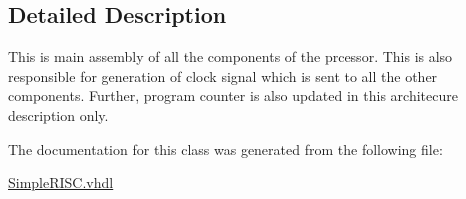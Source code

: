 \subsection{Detailed Description}
This is main assembly of all the components of the prcessor. This is also responsible for generation of clock signal which is sent to all the other components. Further, program counter is also updated in this architecure description only. 

The documentation for this class was generated from the following file\-:\begin{DoxyCompactItemize}
\item 
\hyperlink{_simple_r_i_s_c_8vhdl}{Simple\-R\-I\-S\-C.\-vhdl}\end{DoxyCompactItemize}
